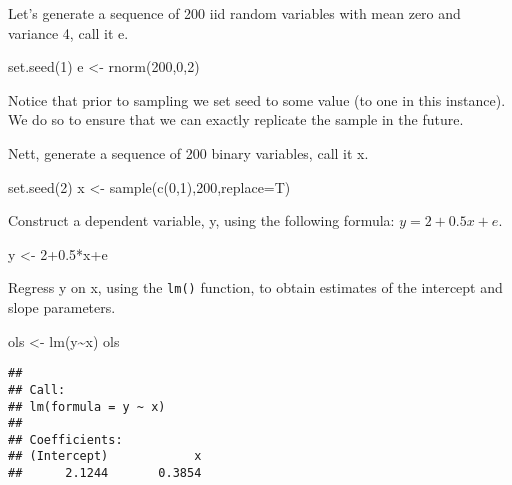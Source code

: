 \documentclass[
  oneside]{book}
\newenvironment{Shaded}{\begin{snugshade}}{\end{snugshade}}
\newcommand{\AttributeTok}[1]{\textcolor[rgb]{0.77,0.63,0.00}{#1}}
\newcommand{\DecValTok}[1]{\textcolor[rgb]{0.00,0.00,0.81}{#1}}
\newcommand{\FloatTok}[1]{\textcolor[rgb]{0.00,0.00,0.81}{#1}}
\newcommand{\FunctionTok}[1]{\textcolor[rgb]{0.00,0.00,0.00}{#1}}
\newcommand{\NormalTok}[1]{#1}
\newcommand{\OtherTok}[1]{\textcolor[rgb]{0.56,0.35,0.01}{#1}}
\newcommand{\SpecialCharTok}[1]{\textcolor[rgb]{0.00,0.00,0.00}{#1}}
\begin{document}
Let's generate a sequence of 200 iid random variables with mean zero and variance 4, call it e.

\begin{Shaded}
\begin{Highlighting}[]
\FunctionTok{set.seed}\NormalTok{(}\DecValTok{1}\NormalTok{)}
\NormalTok{e }\OtherTok{\textless{}{-}} \FunctionTok{rnorm}\NormalTok{(}\DecValTok{200}\NormalTok{,}\DecValTok{0}\NormalTok{,}\DecValTok{2}\NormalTok{)}
\end{Highlighting}
\end{Shaded}

Notice that prior to sampling we set seed to some value (to one in this instance). We do so to ensure that we can exactly replicate the sample in the future.

Nett, generate a sequence of 200 binary variables, call it x.

\begin{Shaded}
\begin{Highlighting}[]
\FunctionTok{set.seed}\NormalTok{(}\DecValTok{2}\NormalTok{)}
\NormalTok{x }\OtherTok{\textless{}{-}} \FunctionTok{sample}\NormalTok{(}\FunctionTok{c}\NormalTok{(}\DecValTok{0}\NormalTok{,}\DecValTok{1}\NormalTok{),}\DecValTok{200}\NormalTok{,}\AttributeTok{replace=}\NormalTok{T)}
\end{Highlighting}
\end{Shaded}

Construct a dependent variable, y, using the following formula: \(y=2+0.5x+e\).

\begin{Shaded}
\begin{Highlighting}[]
\NormalTok{y }\OtherTok{\textless{}{-}} \DecValTok{2}\FloatTok{+0.5}\SpecialCharTok{*}\NormalTok{x}\SpecialCharTok{+}\NormalTok{e}
\end{Highlighting}
\end{Shaded}

Regress y on x, using the \texttt{lm()} function, to obtain estimates of the intercept and slope parameters.

\begin{Shaded}
\begin{Highlighting}[]
\NormalTok{ols }\OtherTok{\textless{}{-}} \FunctionTok{lm}\NormalTok{(y}\SpecialCharTok{\textasciitilde{}}\NormalTok{x)}
\NormalTok{ols}
\end{Highlighting}
\end{Shaded}

\begin{verbatim}
## 
## Call:
## lm(formula = y ~ x)
## 
## Coefficients:
## (Intercept)            x  
##      2.1244       0.3854
\end{verbatim}
\end{document}
